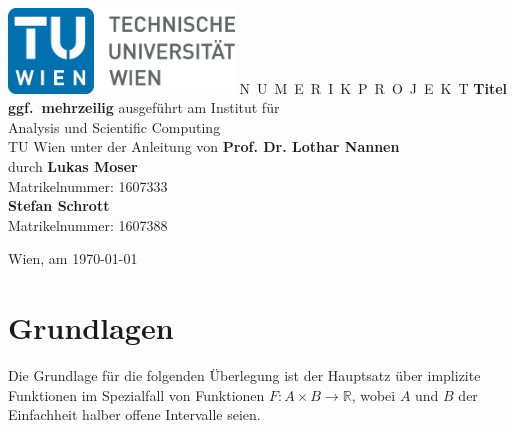 \documentclass[a4paper,11pt,bibliography=totoc,listof=totoc,headinclude=true,cleardoublepage=empty,oneside]{scrartcl}
\newcommand{\R}{\mathbb{R}}
\newcounter{satz}
\begin{document}



\begin{titlepage}
  \begin{center}
    \includegraphics[width=0.45\textwidth]{TULogo.eps}
    \vskip 1cm%
    {\LARGE N~\Large U~M~E~R~I~K~P~R~O~J~E~K~T}
    \vskip 8mm
    {\huge\bfseries\color{change}Titel \\[1ex] ggf.\ mehrzeilig}
    \vskip 1cm
    \large 
    ausgef\"uhrt am    
    \vskip 0.75cm
    {\Large Institut f\"ur\\[1ex] Analysis und Scientific Computing}\\[1ex]
    {\Large TU Wien}
    \vskip0.75cm
    unter der Anleitung von
    \vskip0.75cm
    {\Large\bfseries Prof. Dr. Lothar Nannen}\\[1ex]
    \vskip 0.5cm
    durch
    \vskip 0.5cm
    {\Large\bfseries Lukas Moser }\\[1ex]
    Matrikelnummer: {1607333}\\[1ex]
    {\Large\bfseries Stefan Schrott}\\[1ex]
    Matrikelnummer: {1607388}\\[1ex]
   
  \end{center}
  
  \vfill
  
  \small
  Wien, am \today
  \vspace*{-15mm}
\end{titlepage}

\cleardoublepage



\tableofcontents

\cleardoublepage
{} 


\section{Grundlagen}
Die Grundlage für die folgenden Überlegung ist der Hauptsatz über implizite Funktionen im Spezialfall von Funktionen $F: A \times B \to \R$, wobei $A$ und $B$ der Einfachheit halber offene Intervalle seien.
\end{document}
